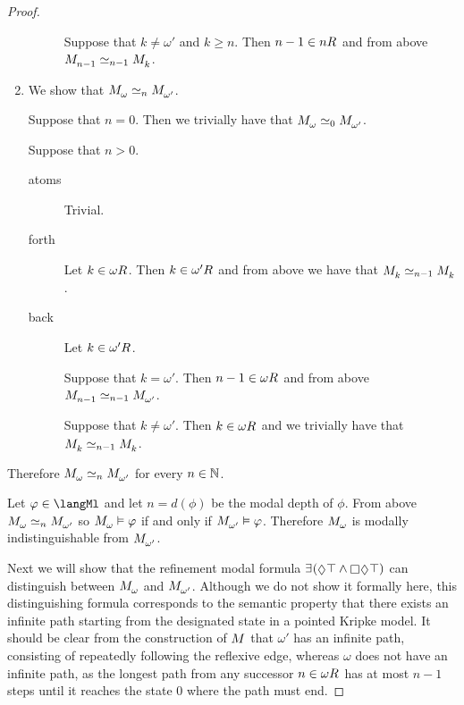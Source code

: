 \begin{proof}
\begin{enumerate}
\begin{description}
                Suppose that $k \neq \omega'$ and $k \geq n$. Then $n - 1 \in \kSuccessors{}{n}$ and from above $\kPModel{n - 1} \bisimilar[n - 1] \kPModel{k}$.
        \end{description}

    \item We show that $\kPModel{\omega} \bisimilar[n] \kPModel{\omega'}$.

        Suppose that $n = 0$. Then we trivially have that $\kPModel{\omega} \bisimilar[0] \kPModel{\omega'}$.

        Suppose that $n > 0$.

        \begin{description}
            \item[atoms] Trivial.

            \item[forth] Let $k \in \kSuccessors{}{\omega}$. Then $k \in \kSuccessors{}{\omega'}$ and from above we have that $\kPModel{k} \bisimilar[n - 1] \kPModel{k}$.

            \item[back] Let $k \in \kSuccessors{}{\omega'}$.

                Suppose that $k = \omega'$. Then $n - 1 \in \kSuccessors{}{\omega}$ and from above $\kPModel{n - 1} \bisimilar[n - 1] \kPModel{\omega'}$.

                Suppose that $k \neq \omega'$. Then $k \in \kSuccessors{}{\omega}$ and we trivially have that $\kPModel{k} \bisimilar[n - 1] \kPModel{k}$.
        \end{description}
\end{enumerate}

Therefore $\kPModel{\omega} \bisimilar[n] \kPModel{\omega'}$ for every $n \in \mathbb{N}$.

Let $\phi \in \langMl$ and let $n = d(\phi)$ be the modal depth of $\phi$.
From above $\kPModel{\omega} \bisimilar[n] \kPModel{\omega'}$ so $\kPModel{\omega} \entails \phi$ if and only if $\kPModel{\omega'} \entails \phi$.
Therefore $\kPModel{\omega}$ is modally indistinguishable from $\kPModel{\omega'}$.

Next we will show that the refinement modal formula $\somerefs (\possible \top \land \necessary \possible \top)$ can distinguish between $\kPModel{\omega}$ and $\kPModel{\omega'}$.
Although we do not show it formally here, this distinguishing formula corresponds to the semantic property that there exists an infinite path starting from the designated state in a pointed Kripke model.
It should be clear from the construction of $\kModel$ that $\omega'$ has an infinite path, consisting of repeatedly following the reflexive edge, whereas $\omega$ does not have an infinite path, as the longest path from any successor $n \in \kSuccessors{}{\omega}$ has at most $n - 1$ steps until it reaches the state $0$ where the path must end.


\end{proof}
